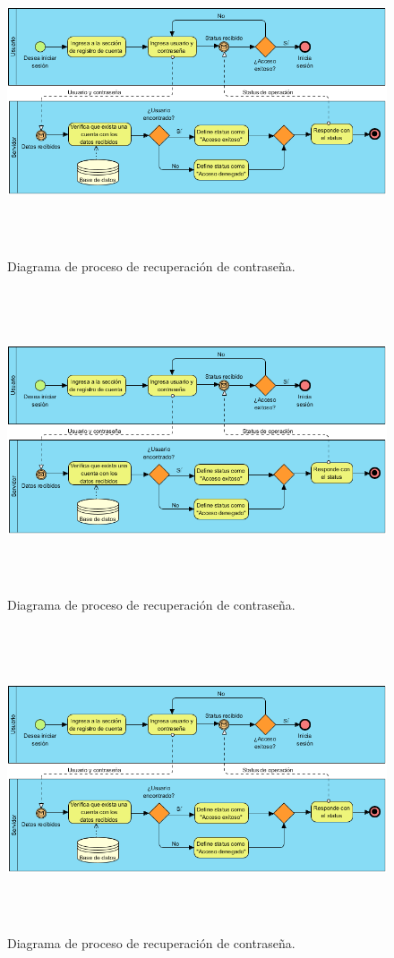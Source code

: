 \begin{figure}[h!]
	\centering
	\includegraphics[width=15cm,height=9cm]{imagenes/desarrollo/diagramas/BPMN_LOGIN.png}
	\caption{Diagrama de proceso de recuperación de contraseña.}
	\label{fig:recover}
\end{figure}
\begin{figure}[h!]
	\centering
	\includegraphics[width=15cm,height=9cm]{imagenes/desarrollo/diagramas/BPMN_LOGIN.png}
	\caption{Diagrama de proceso de recuperación de contraseña.}
	\label{fig:recover}
\end{figure}
\begin{figure}[h!]
	\centering
	\includegraphics[width=15cm,height=9cm]{imagenes/desarrollo/diagramas/BPMN_LOGIN.png}
	\caption{Diagrama de proceso de recuperación de contraseña.}
	\label{fig:recover}
\end{figure}

